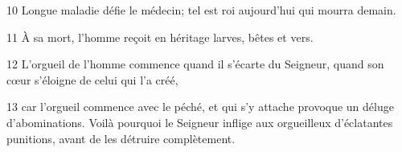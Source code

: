 
10 Longue maladie défie le médecin; tel est roi aujourd’hui qui mourra demain.

11 À sa mort, l’homme reçoit en héritage larves, bêtes et vers.

12 L’orgueil de l’homme commence quand il s’écarte du Seigneur, quand son cœur s’éloigne de celui qui l’a créé,

13 car l’orgueil commence avec le péché, et qui s’y attache provoque un déluge d’abominations. Voilà pourquoi le Seigneur inflige aux orgueilleux d’éclatantes punitions, avant de les détruire complètement.